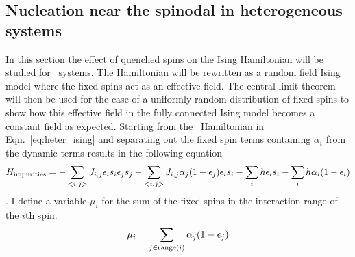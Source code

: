 \subsection{Nucleation near the spinodal in heterogeneous systems}

In this section the effect of quenched spins on the Ising Hamiltonian will be studied for \lr\ systems. The  Hamiltonian will be rewritten as a random field Ising model where the fixed spins act as an effective field. The central limit theorem will then be used for the case of a uniformly random distribution of fixed spins to show how this effective field in the fully connected Ising model becomes a constant field as expected.   %
Starting from the \het\  Hamiltonian in Eqn.~\ref{eq:heter_ising} and separating out the fixed spin terms containing $\alpha_i$ from the dynamic terms results in the following equation
\begin{eqnarray}
H_{\rm impurities} = -\sum\limits_{{<}i,j{>}} J_{i,j} \epsilon_i s_i \epsilon_j s_j 
-\sum\limits_{{<}i,j{>}} J_{i,j}  \alpha_j(1-\epsilon_j) \epsilon_i s_i -\sum\limits_{i} h \epsilon_i s_i 
-\sum\limits_{i} h \alpha_i (1-\epsilon_i) 
\end{eqnarray}
.
I define a variable $ \mu_i$ for the sum of the fixed spins in the interaction range of the $i$th spin.    %
\begin{equation}
\mu_i = \sum\limits_{j \in {\rm range}(i)} \alpha_j (1-\epsilon_j) 
\end{equation}%

